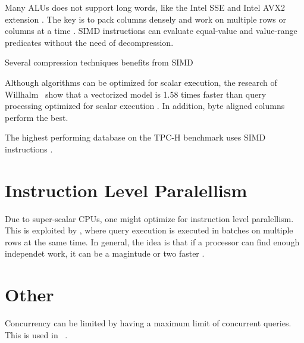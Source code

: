 Many ALUs does not support long words, like the Intel SSE and Intel AVX2 extension \cite{Willhalm2009-hu, Willhalm2013-rl}. The key is to pack columns densely and work on multiple rows or columns at a time \cite{Johnson2008-cp}. SIMD instructions can evaluate equal-value and value-range predicates without the need of decompression.

Several compression techniques benefits from SIMD \cite{Lemke2010-is}

Although algorithms can be optimized for scalar execution, the research of Willhalm \ea~show that a vectorized model is 1.58 times faster than query processing optimized for scalar execution \cite{Willhalm2009-hu}. In addition, byte aligned columns perform the best.

The highest performing database on the TPC-H benchmark uses SIMD instructions \cite{Exasol2014-xh}.

\section{Instruction Level Paralellism}
\label{sec:Instruction Level Paralellism}
Due to super-scalar CPUs, one might optimize for instruction level paralellism. This is exploited by \blink, where query execution is executed in batches on multiple rows at the same time. In general, the idea is that if a processor can find enough independet work, it can be a magintude or two faster \cite{Boncz2005-wj}.

\section{Other}
\label{sec:Other}
Concurrency can be limited by having a maximum limit of concurrent queries. This is used in \ibm~\cite{Raman2013-em}.
